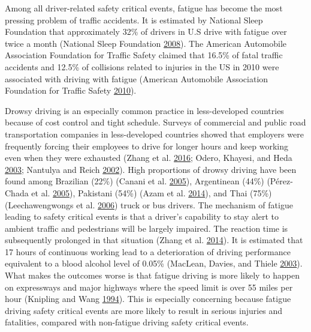 \documentclass[12pt]{book}
\numberwithin{equation}{chapter}
\begin{document}
Among all driver-related safety critical events, fatigue has become the most pressing problem of traffic accidents. It is estimated by National Sleep Foundation that approximately 32\% of drivers in U.S drive with fatigue over twice a month (National Sleep Foundation \protect\hyperlink{ref-nsleepf}{2008}). The American Automobile Association Foundation for Traffic Safety claimed that 16.5\% of fatal traffic accidents and 12.5\% of collisions related to injuries in the US in 2010 were associated with driving with fatigue (American Automobile Association Foundation for Traffic Safety \protect\hyperlink{ref-aaafoundation}{2010}).

Drowsy driving is an especially common practice in less-developed countries because of cost control and tight schedule. Surveys of commercial and public road transportation companies in less-developed countries showed that employers were frequently forcing their employees to drive for longer hours and keep working even when they were exhausted (Zhang et al. \protect\hyperlink{ref-zhang2016traffic}{2016}; Odero, Khayesi, and Heda \protect\hyperlink{ref-odero2003road}{2003}; Nantulya and Reich \protect\hyperlink{ref-nantulya2002neglected}{2002}). High proportions of drowsy driving have been found among Brazilian (22\%) (Canani et al. \protect\hyperlink{ref-canani2005prevalence}{2005}), Argentinean (44\%) (Pérez-Chada et al. \protect\hyperlink{ref-perez2005sleep}{2005}), Pakistani (54\%) (Azam et al. \protect\hyperlink{ref-azam2014comparison}{2014}), and Thai (75\%) (Leechawengwongs et al. \protect\hyperlink{ref-leechawengwongs2006role}{2006}) truck or bus drivers. The mechanism of fatigue leading to safety critical events is that a driver's capability to stay alert to ambient traffic and pedestrians will be largely impaired. The reaction time is subsequently prolonged in that situation (Zhang et al. \protect\hyperlink{ref-zhang2014study}{2014}). It is estimated that 17 hours of continuous working lead to a deterioration of driving performance equivalent to a blood alcohol level of 0.05\% (MacLean, Davies, and Thiele \protect\hyperlink{ref-maclean2003hazards}{2003}). What makes the outcomes worse is that fatigue driving is more likely to happen on expressways and major highways where the speed limit is over 55 miles per hour (Knipling and Wang \protect\hyperlink{ref-knipling1994crashes}{1994}). This is especially concerning because fatigue driving safety critical events are more likely to result in serious injuries and fatalities, compared with non-fatigue driving safety critical events.
\end{document}
